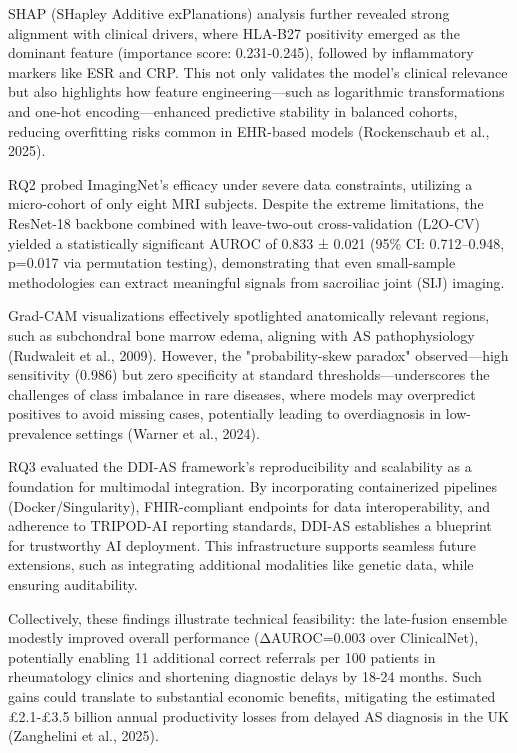 \documentclass[12pt, a4paper]{article}
\begin{document}
SHAP (SHapley Additive exPlanations) analysis further revealed strong alignment with clinical drivers, where HLA-B27 positivity emerged as the dominant feature (importance score: 0.231-0.245), followed by inflammatory markers like ESR and CRP. This not only validates the model's clinical relevance but also highlights how feature engineering—such as logarithmic transformations and one-hot encoding—enhanced predictive stability in balanced cohorts, reducing overfitting risks common in EHR-based models (Rockenschaub et al., 2025).

RQ2 probed ImagingNet's efficacy under severe data constraints, utilizing a micro-cohort of only eight MRI subjects. Despite the extreme limitations, the ResNet-18 backbone combined with leave-two-out cross-validation (L2O-CV) yielded a statistically significant AUROC of 0.833 ± 0.021 (95\% CI: 0.712–0.948, p=0.017 via permutation testing), demonstrating that even small-sample methodologies can extract meaningful signals from sacroiliac joint (SIJ) imaging. 

Grad-CAM visualizations effectively spotlighted anatomically relevant regions, such as subchondral bone marrow edema, aligning with AS pathophysiology (Rudwaleit et al., 2009). However, the "probability-skew paradox" observed—high sensitivity (0.986) but zero specificity at standard thresholds—underscores the challenges of class imbalance in rare diseases, where models may overpredict positives to avoid missing cases, potentially leading to overdiagnosis in low-prevalence settings (Warner et al., 2024).

RQ3 evaluated the DDI-AS framework's reproducibility and scalability as a foundation for multimodal integration. By incorporating containerized pipelines (Docker/Singularity), FHIR-compliant endpoints for data interoperability, and adherence to TRIPOD-AI reporting standards, DDI-AS establishes a blueprint for trustworthy AI deployment. This infrastructure supports seamless future extensions, such as integrating additional modalities like genetic data, while ensuring auditability. 

Collectively, these findings illustrate technical feasibility: the late-fusion ensemble modestly improved overall performance (ΔAUROC=0.003 over ClinicalNet), potentially enabling 11 additional correct referrals per 100 patients in rheumatology clinics and shortening diagnostic delays by 18-24 months. Such gains could translate to substantial economic benefits, mitigating the estimated \pounds2.1-\pounds3.5 billion annual productivity losses from delayed AS diagnosis in the UK (Zanghelini et al., 2025). 
\end{document}
